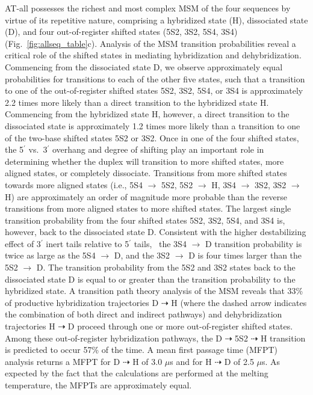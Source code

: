 \documentclass[journal=jpcbfk,manuscript=article]{achemso}
\begin{document}
AT-all possesses the richest and most complex MSM of the four sequences by virtue of its repetitive nature, comprising a hybridized state (H), dissociated state (D), and four out-of-register shifted states (5S2, 3S2, 5S4, 3S4) (Fig.~\ref{fig:allseq_table}c). Analysis of the MSM transition probabilities reveal a critical role of the shifted states in mediating hybridization and dehybridization. Commencing from the dissociated state D, we observe approximately equal probabilities for transitions to each of the other five states, such that a transition to one of the out-of-register shifted states 5S2, 3S2, 5S4, or 3S4 is approximately 2.2 times more likely than a direct transition to the hybridized state H. Commencing from the hybridized state H, however, a direct transition to the dissociated state is approximately 1.2 times more likely than a transition to one of the two-base shifted states 5S2 or 3S2. Once in one of the four shifted states, the 5$^\prime$ vs.\ 3$^\prime$ overhang and degree of shifting play an important role in determining whether the duplex will transition to more shifted states, more aligned states, or completely dissociate. Transitions from more shifted states towards more aligned states (i.e., 5S4 $\rightarrow$ 5S2, 5S2 $\rightarrow$ H, 3S4 $\rightarrow$ 3S2, 3S2 $\rightarrow$ H) are approximately an order of magnitude more probable than the reverse transitions from more aligned states to more shifted states. The largest single transition probability from the four shifted states 5S2, 3S2, 5S4, and 3S4 is, however, back to the dissociated state D. Consistent with the higher destabilizing effect of 3$^\prime$ inert tails relative to 5$^\prime$ tails,~\citep{Doktycz1990ThermodynamicC, Dickman2012ThermodynamicDNAs, DiMichele2014EffectHybridization} the 3S4 $\rightarrow$ D transition probability is twice as large as the 5S4 $\rightarrow$ D, and the 3S2 $\rightarrow$ D is four times larger than the 5S2 $\rightarrow$ D. The transition probability from the 5S2 and 3S2 states back to the dissociated state D is equal to or greater than the transition probability to the hybridized state. A transition path theory analysis of the MSM reveals that 33\% of productive hybridization trajectories D $\dashrightarrow$ H (where the dashed arrow indicates the combination of both direct and indirect pathways) and dehybridization trajectories H $\dashrightarrow$ D proceed through one or more out-of-register shifted states. Among these out-of-register hybridization pathways, the D $\dashrightarrow$ 5S2 $\dashrightarrow$ H transition is predicted to occur 57\% of the time. A mean first passage time (MFPT) analysis returns a MFPT for D $\dashrightarrow$ H of 3.0 $\mu$s and for H $\dashrightarrow$ D of 2.5 $\mu$s. As expected by the fact that the calculations are performed at the melting temperature, the MFPTs are approximately equal.  
\end{document}
